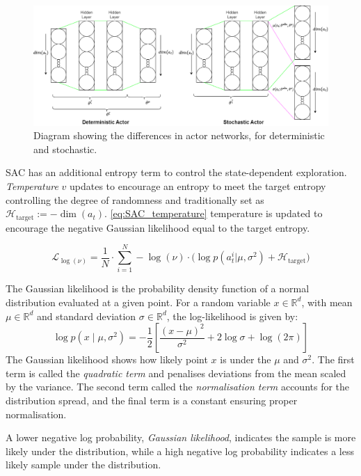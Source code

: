 \begin{figure}[H]
    \centering
    \includegraphics[width=0.95\linewidth]{figures/LiteratureStudy/RL_diagram_ActorNetworks.png}
    \caption{Diagram showing the differences in actor networks, for deterministic and stochastic.}
    \label{fig:actor_networks}
\end{figure}

SAC has an additional entropy term to control the state-dependent exploration. \textit{Temperature} $v$ updates to encourage an entropy to meet the target entropy controlling the degree of randomness and traditionally set as  \(\mathcal{H}_{\text{target}} := -\dim(a_t)\). \autoref{eq:SAC_temperature} temperature is updated to encourage the negative Gaussian likelihood equal to the target entropy.

\begin{equation}
    \mathcal{L}_{\log(\nu)} = \frac{1}{N} \cdot \sum_{i=1}^{N}-\log(\nu) \cdot \bigg(\log p(a_t^i|\mu,\sigma^2)+\mathcal{H}_{\text{target}}\bigg)
\label{eq:SAC_temperature}
\end{equation}


\begin{tcolorbox}[title={\textbf{Lemma. Gaussian likelihood}}]
The Gaussian likelihood is the probability density function of a normal distribution evaluated at a given point. For a random variable \( x \in \mathbb{R}^d \), with mean \( \mu \in \mathbb{R}^d \) and standard deviation \( \sigma \in \mathbb{R}^d \), the log-likelihood is given by:
\[
\log p(x \mid \mu, \sigma^2) = -\frac{1}{2} \left[ \frac{(x - \mu)^2}{\sigma^2} + 2 \log \sigma + \log(2\pi) \right]
\]
The Gaussian likelihood shows how likely point $x$ is under the $\mu$ and $\sigma^2$. The first term is called the \textit{quadratic term} and penalises deviations from the mean scaled by the variance. The second term called the \textit{normalisation term} accounts for the distribution spread, and the final term is a constant ensuring proper normalisation.

A lower negative log probability, \textit{Gaussian likelihood}, indicates the sample is more likely under the distribution, while a high negative log probability indicates a less likely sample under the distribution.
\end{tcolorbox}

